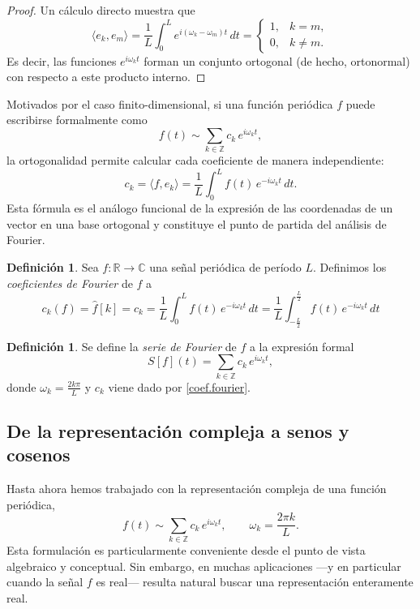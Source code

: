 \documentclass[12pt, a4paper]{amsbook}
\newcommand{\R}{{\mathbb R}}
\newcommand{\Z}{{\mathbb Z}}
\newcommand{\C}{{\mathbb C}}
\theoremstyle{remark}
\theoremstyle{definition}
\newtheorem{defi}[teo]{Definición}
\numberwithin{section}{chapter}
\numberwithin{subsection}{section}
\numberwithin{equation}{section}
\numberwithin{figure}{chapter}
\begin{document}
\begin{proof}
Un cálculo directo muestra que
$$
\langle e_k, e_m\rangle = \frac{1}{L}\int_0^L e^{i(\omega_k-\omega_m)t}\,dt =
\begin{cases}
1, & k=m,\\
0, & k\neq m.
\end{cases}
$$
Es decir, las funciones $e^{i\omega_k t}$ forman un conjunto ortogonal (de hecho, ortonormal) con respecto a este producto interno.
\end{proof}


Motivados por el caso finito-dimensional, si una función periódica $f$ puede escribirse formalmente como
$$
f(t) \sim \sum_{k\in\Z} c_k\, e^{i\omega_k t},
$$
la ortogonalidad permite calcular cada coeficiente de manera independiente:
\begin{equation}\label{coef.fourier}
c_k = \langle f, e_k\rangle = \frac{1}{L}\int_0^L f(t)\,e^{-i\omega_k t}\,dt.
\end{equation}
Esta fórmula es el análogo funcional de la expresión de las coordenadas de un vector en una base ortogonal y constituye el punto de partida del análisis de Fourier.

\begin{defi}
Sea $f\colon \R\to\C$ una señal periódica de período $L$. Definimos los {\em coeficientes de Fourier} de $f$ a 
$$
c_k(f) = \hat f[k] = c_k = \frac{1}{L}\int_0^L f(t)\,e^{-i\omega_k t}\,dt =\frac{1}{L}\int_{-\frac{L}{2}}^{\frac{L}{2}} f(t)\,e^{-i\omega_k t}\,dt
$$
\end{defi}

\begin{defi}
Se define la {\em serie de Fourier} de $f$ a la expresión formal
$$
S[f](t) = \sum_{k\in\Z} c_k\, e^{i\omega_k t},
$$
donde $\omega_k = \frac{2k\pi}{L}$ y $c_k$ viene dado por \eqref{coef.fourier}.
\end{defi}


\subsection{De la representación compleja a senos y cosenos}\label{complejo.a.real}

Hasta ahora hemos trabajado con la representación compleja de una función periódica,
$$
f(t) \sim \sum_{k\in\Z} c_k\, e^{i\omega_k t}, \qquad \omega_k = \frac{2\pi k}{L}.
$$
Esta formulación es particularmente conveniente desde el punto de vista algebraico y conceptual. Sin embargo, en muchas aplicaciones —y en particular cuando la señal $f$ es real— resulta natural buscar una representación enteramente real.
\end{document}
